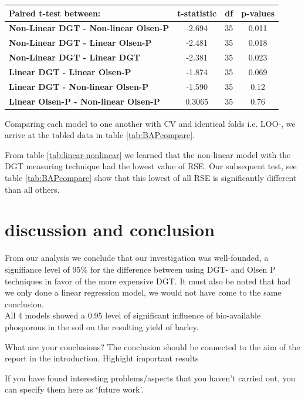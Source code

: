 \documentclass{article}
\begin{document}
\begin{table}[]
\begin{tabular}{lccc}\toprule[1.5pt]
\textbf{Paired t-test between:}                          & \multicolumn{1}{l}{\textbf{t-statistic}} & \multicolumn{1}{l}{\textbf{df}} & \multicolumn{1}{l}{\textbf{p-values}} \\\midrule
\textbf{Non-Linear DGT - Non-linear Olsen-P} & -2.694                                   & 35                              & 0.011                                 \\\midrule
\textbf{Non-Linear DGT - Linear Olsen-P}     & -2.481                                   & 35                              & 0.018                                 \\\midrule
\textbf{Non-Linear DGT - Linear DGT}         & -2.381                                   & 35                              & 0.023                                 \\\midrule
\textbf{Linear DGT - Linear Olsen-P}         & -1.874                                   & 35                              & 0.069                                 \\\midrule
\textbf{Linear DGT - Non-linear Olsen-P}     & -1.590                                   & 35                              & 0.12                                  \\\midrule
\textbf{Linear Olsen-P - Non-linear Olsen-P} & 0.3065                                   & 35                              & 0.76                      \\
\bottomrule[1.25pt]           
\end{tabular}
\end{table}

Comparing each model to one another with CV and identical folds i.e. LOO-, we arrive at the tabled data in table \ref{tab:BAPcompare}.

From table \ref{tab:linear-nonlinear} we learned that the non-linear model with the DGT measuring technique had the lowest value of RSE. Our subsequent test, see table \ref{tab:BAPcompare} show that this lowest of all RSE is significantly different than all others.



\section{discussion and conclusion}

From our analysis we conclude that our investigation was well-founded, a signifiance level of 95\% for the difference between using DGT- and Olsen P techniques in favor of the more expensive DGT. It  must also be noted that had we only done a linear regression model, we would not have come to the same conclusion. \\ All 4 models showed a 0.95 level of significant influence of bio-available phosporous in the soil on the resulting yield of barley.

What are your conclusions? The conclusion should be connected to the aim of the report in the introduction.
	Highight important results
	
If you have found interesting problems/aspects that you haven’t carried out, you can specify them here as ‘future work’.
\end{document}
